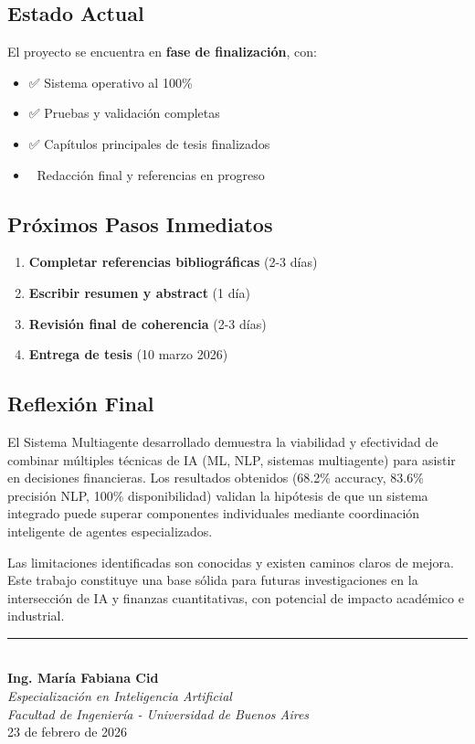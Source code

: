 \documentclass[12pt,a4paper]{article}
\begin{document}
\subsection{Estado Actual}

El proyecto se encuentra en \textbf{fase de finalización}, con:
\begin{itemize}
    \item ✅ Sistema operativo al 100\%
    \item ✅ Pruebas y validación completas
    \item ✅ Capítulos principales de tesis finalizados
    \item 🔄 Redacción final y referencias en progreso
\end{itemize}

\subsection{Próximos Pasos Inmediatos}

\begin{enumerate}
    \item \textbf{Completar referencias bibliográficas} (2-3 días)
    \item \textbf{Escribir resumen y abstract} (1 día)
    \item \textbf{Revisión final de coherencia} (2-3 días)
    \item \textbf{Entrega de tesis} (10 marzo 2026)
\end{enumerate}

\subsection{Reflexión Final}

El Sistema Multiagente desarrollado demuestra la viabilidad y efectividad de combinar múltiples técnicas de IA (ML, NLP, sistemas multiagente) para asistir en decisiones financieras. Los resultados obtenidos (68.2\% accuracy, 83.6\% precisión NLP, 100\% disponibilidad) validan la hipótesis de que un sistema integrado puede superar componentes individuales mediante coordinación inteligente de agentes especializados.

Las limitaciones identificadas son conocidas y existen caminos claros de mejora. Este trabajo constituye una base sólida para futuras investigaciones en la intersección de IA y finanzas cuantitativas, con potencial de impacto académico e industrial.

\vspace{2cm}

\begin{center}
\rule{10cm}{0.4pt}\\
\vspace{0.5cm}
\textbf{Ing. María Fabiana Cid}\\
\textit{Especialización en Inteligencia Artificial}\\
\textit{Facultad de Ingeniería - Universidad de Buenos Aires}\\
\vspace{0.5cm}
23 de febrero de 2026
\end{center}
\end{document}
